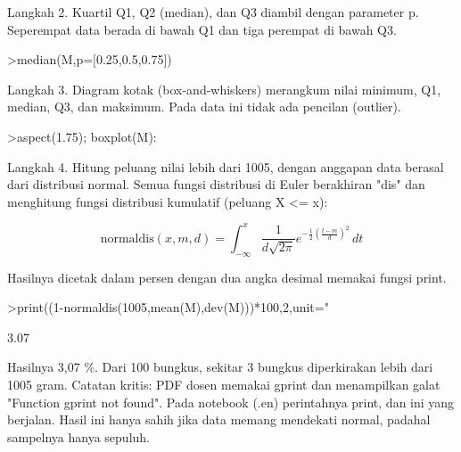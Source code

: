 \documentclass[a4paper,10pt]{article}
\begin{document}
\begin{eulernotebook}
\begin{eulercomment}
\begin{eulercomment}
\begin{eulercomment}
\begin{eulercomment}
\begin{eulercomment}
\begin{eulercomment}
\begin{eulercomment}
Langkah 2. Kuartil Q1, Q2 (median), dan Q3 diambil dengan parameter p. Seperempat data
berada di bawah Q1 dan tiga perempat di bawah Q3.
\end{eulercomment}
\begin{eulerprompt}
>median(M,p=[0.25,0.5,0.75])
\end{eulerprompt}
\begin{euleroutput}
  [998,  999,  1001.8]
\end{euleroutput}
\begin{eulercomment}
Langkah 3. Diagram kotak (box-and-whiskers) merangkum nilai minimum, Q1, median, Q3, dan
maksimum. Pada data ini tidak ada pencilan (outlier).
\end{eulercomment}
\begin{eulerprompt}
>aspect(1.75); boxplot(M):
\end{eulerprompt}
\begin{eulercomment}
Langkah 4. Hitung peluang nilai lebih dari 1005, dengan anggapan data berasal dari
distribusi normal. Semua fungsi distribusi di Euler berakhiran "dis" dan menghitung
fungsi distribusi kumulatif (peluang X \textless{}= x):
\end{eulercomment}
\begin{eulerformula}
\[
\text{normaldis}(x,m,d)=\int_{-\infty}^x \frac{1}{d\sqrt{2\pi}}e^{-\frac{1}{2}\left(\frac{t-m}{d}\right)^2}\,dt
\]
\end{eulerformula}
\begin{eulercomment}
Hasilnya dicetak dalam persen dengan dua angka desimal memakai fungsi print.
\end{eulercomment}
\begin{eulerprompt}
>print((1-normaldis(1005,mean(M),dev(M)))*100,2,unit=" %
\end{eulerprompt}
\begin{euleroutput}
        3.07 %
\end{euleroutput}
\begin{eulercomment}
Hasilnya 3,07 \%. Dari 100 bungkus, sekitar 3 bungkus diperkirakan lebih dari 1005 gram.
Catatan kritis: PDF dosen memakai gprint dan menampilkan galat "Function gprint not
found". Pada notebook (.en) perintahnya print, dan ini yang berjalan. Hasil ini hanya
sahih jika data memang mendekati normal, padahal sampelnya hanya sepuluh.


\end{eulercomment}
\end{eulercomment}
\end{eulercomment}
\end{eulercomment}
\end{eulercomment}
\end{eulercomment}
\end{eulercomment}
\end{eulernotebook}
\end{document}
